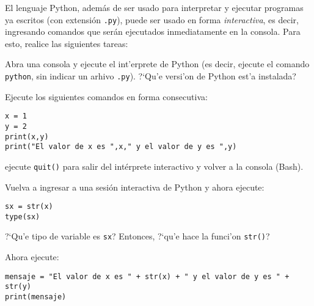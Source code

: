 \documentclass[11pt]{exam}
\begin{document}
\firstpageheadrule
\runningheadrule
{}
\cfoot{ }
\begin{flushleft}
\vspace{0.2in}

\vspace{0.25cm}
\end{flushleft}
\begin{questions}
\item  El lenguaje Python, además de ser usado para interpretar y ejecutar programas ya escritos (con extensión \texttt{.py}), puede ser usado en forma \textit{interactiva}, es decir, ingresando comandos que serán ejecutados inmediatamente en la consola. Para esto, realice las siguientes tareas:

\begin{parts}
\item Abra una consola y ejecute el int'erprete de Python (es decir, ejecute el comando \texttt{python}, sin indicar un arhivo \texttt{.py}). ?`Qu'e versi'on de Python est'a instalada?
\item Ejecute los siguientes comandos en forma consecutiva:

\begin{verbatim}
x = 1
y = 2
print(x,y)
print("El valor de x es ",x," y el valor de y es ",y)
\end{verbatim}
\item ejecute \texttt{quit()} para salir del intérprete interactivo y volver a la consola (Bash).
\item Vuelva a ingresar a una sesión interactiva de Python y ahora ejecute:

\begin{verbatim}
sx = str(x)
type(sx)
\end{verbatim}

?`Qu'e tipo de variable es \texttt{sx}? Entonces, ?`qu'e hace la funci'on \texttt{str()}?
\item Ahora ejecute:

\begin{verbatim}
mensaje = "El valor de x es " + str(x) + " y el valor de y es " + str(y)
print(mensaje)
\end{verbatim}


\end{parts}
\end{questions}
\end{document}
